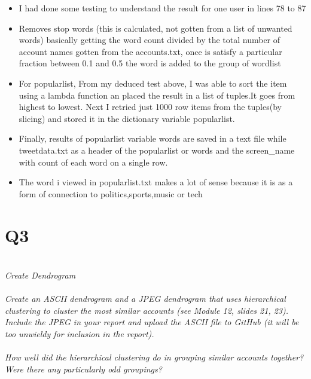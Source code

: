 \documentclass[12pt]{article}
\begin{document}
\begin{itemize}
        \item I had done some testing to understand the result for one user in lines 78 to 87 
        
        \item Removes stop words (this is calculated, not  gotten from a list of unwanted words) basically getting the word count divided  by the total number of account names gotten from the accounts.txt, once is satisfy a particular fraction between 0.1 and 0.5 the word is added to the group of wordlist
        \item For popularlist, From my deduced test above, I was able to sort the item using a lambda function an placed the result in a list of tuples.It goes from highest to lowest. Next I retried just 1000 row items from the tuples(by slicing) and stored it in the dictionary variable popularlist.
        
        \item Finally, results of popularlist variable words are saved in a text file while tweetdata.txt as a header of the popularlist or words and the screen\_name with count of each word on a single row.
        \item The word i viewed in popularlist.txt makes a lot of sense because it is as a form of connection to politics,sports,music or tech
    \end{itemize}

\section*{Q3}
\emph{
\\Create Dendrogram\\ \\Create an ASCII dendrogram and a JPEG dendrogram that uses hierarchical clustering to cluster the most similar accounts (see Module 12, slides 21, 23). Include the JPEG in your report and upload the ASCII file to GitHub (it will be too unwieldy for inclusion in the report).\\ \\How well did the hierarchical clustering do in grouping similar accounts together? Were there any particularly odd groupings?
}
\end{document}
